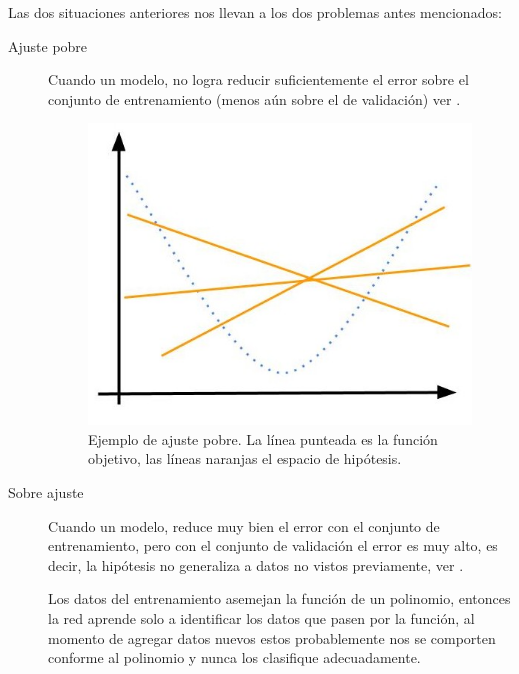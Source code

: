 Las dos situaciones anteriores nos llevan a los dos problemas antes mencionados:
\begin{description}
 \item [Ajuste pobre] 
 Cuando un modelo, no logra reducir suficientemente el error sobre el conjunto de entrenamiento (menos aún sobre el de validación) ver .
  \begin{figure}[H]
   \centering
   \includegraphics[scale=0.5]{../Figuras/underfitting.jpg}
   \caption{Ejemplo de ajuste pobre. La línea punteada es la función objetivo, las líneas naranjas el espacio de hipótesis.}
   \label{fig:underF}
  \end{figure}

 \item [Sobre ajuste]
 Cuando un modelo, reduce muy bien el error con el conjunto de entrenamiento, pero con el conjunto de validación el error es muy alto, es decir, la hipótesis no generaliza a datos no vistos previamente, ver .
 \begin{example}
  Los datos del entrenamiento asemejan la función de un polinomio, entonces la red aprende solo a identificar los datos que pasen por la función, al momento de agregar datos nuevos estos probablemente nos se comporten conforme al polinomio y nunca los clasifique adecuadamente. 
 \end{example}


\end{description}
